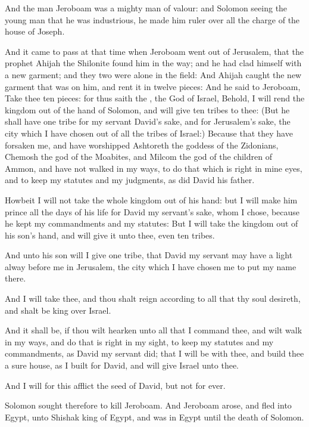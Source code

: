\verse And the man Jeroboam was a mighty man of valour: and Solomon seeing the young man that he was industrious, he made him ruler over all the charge of the house of Joseph.

\verse And it came to pass at that time when Jeroboam went out of Jerusalem, that the prophet Ahijah the Shilonite found him in the way; and he had clad himself with a new garment; and they two were alone in the field: \verse And Ahijah caught the new garment that was on him, and rent it in twelve pieces: \verse And he said to Jeroboam, Take thee ten pieces: for thus saith the \LORD, the God of Israel, Behold, I will rend the kingdom out of the hand of Solomon, and will give ten tribes to thee: \verse (But he shall have one tribe for my servant David's sake, and for Jerusalem's sake, the city which I have chosen out of all the tribes of Israel:) \verse Because that they have forsaken me, and have worshipped Ashtoreth the goddess of the Zidonians, Chemosh the god of the Moabites, and Milcom the god of the children of Ammon, and have not walked in my ways, to do that which is right in mine eyes, and to keep my statutes and my judgments, as did David his father.

\verse Howbeit I will not take the whole kingdom out of his hand: but I will make him prince all the days of his life for David my servant's sake, whom I chose, because he kept my commandments and my statutes: \verse But I will take the kingdom out of his son's hand, and will give it unto thee, even ten tribes.

\verse And unto his son will I give one tribe, that David my servant may have a light alway before me in Jerusalem, the city which I have chosen me to put my name there.

\verse And I will take thee, and thou shalt reign according to all that thy soul desireth, and shalt be king over Israel.

\verse And it shall be, if thou wilt hearken unto all that I command thee, and wilt walk in my ways, and do that is right in my sight, to keep my statutes and my commandments, as David my servant did; that I will be with thee, and build thee a sure house, as I built for David, and will give Israel unto thee.

\verse And I will for this afflict the seed of David, but not for ever.

\verse Solomon sought therefore to kill Jeroboam. And Jeroboam arose, and fled into Egypt, unto Shishak king of Egypt, and was in Egypt until the death of Solomon.

